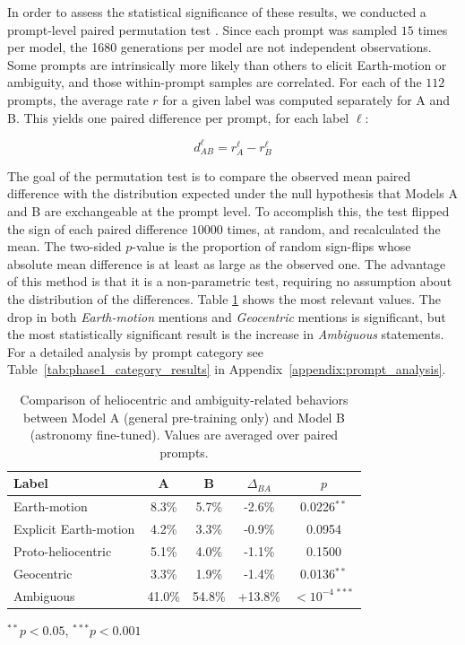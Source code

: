 In order to assess the statistical significance of these results, we conducted a prompt-level paired permutation test \cite{good2005permutation}. Since each prompt was sampled $15$ times per model, the 1680 generations per model are not independent observations. Some prompts are intrinsically more likely than others to elicit Earth-motion or ambiguity, and those within-prompt samples are correlated. For each of the $112$ prompts, the average rate $r$ for a given label was computed separately for A and B. This yields one paired difference per prompt, for each label $\ell$:

$$d^{\ell}_{AB} = r^{\ell}_{A} - r^{\ell}_{B}$$

The goal of the permutation test is to compare the observed mean paired difference with the distribution expected under the null hypothesis that Models A and B are exchangeable at the prompt level. To accomplish this, the test flipped the sign of each paired difference $10000$ times, at random, and recalculated the mean. The two-sided $p$-value is the proportion of random sign-flips whose absolute mean difference is at least as large as the observed one. The advantage of this method is that it is a non-parametric test, requiring no assumption about the distribution of the differences. Table \ref{tab:phase1_results} shows the most relevant values. The drop in both \textit{Earth-motion} mentions and \textit{Geocentric} mentions is significant, but the most statistically significant result is the increase in \textit{Ambiguous} statements. For a detailed analysis by prompt category see Table~\ref{tab:phase1_category_results} in Appendix~\ref{appendix:prompt_analysis}. 


\begin{table}[t]
\centering
\setlength{\tabcolsep}{4pt}
\caption{Comparison of heliocentric and ambiguity-related behaviors between Model A (general pre-training only) and Model B (astronomy fine-tuned). Values are averaged over paired prompts.}
\label{tab:phase1_results}
\begin{tabular}{lcccc}
\hline
Label & A & B & $\Delta_{BA}$ & $p$ \\
\hline
Earth-motion          & 8.3\%  & 5.7\%    & -2.6\%  & 0.0226$^{**}$ \\
Explicit Earth-motion & 4.2\%  & 3.3\%    & -0.9\%  & 0.0954 \\
Proto-heliocentric    & 5.1\%  & 4.0\%    & -1.1\%  & 0.1500 \\
Geocentric            & 3.3\%  & 1.9\%    & -1.4\%  & 0.0136$^{**}$ \\
Ambiguous             & 41.0\% & 54.8\%   & +13.8\% & $<10^{-4\,***}$ \\
\hline
\end{tabular}
\vspace{0.5em}
\footnotesize{
$^{**} p < 0.05$, \quad
$^{***} p < 0.001$
}
\end{table}

